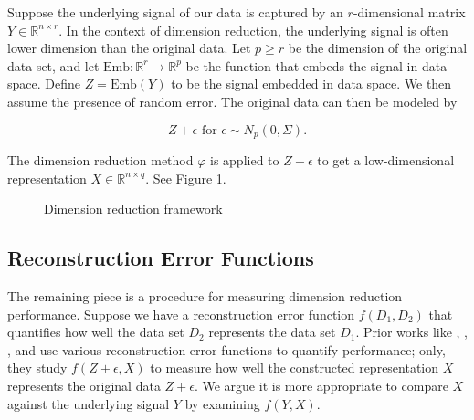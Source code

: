 \documentclass{article}
\begin{document}
Suppose the underlying signal of our data is captured by an $r$-dimensional matrix $Y \in \mathbb{R}^{n \times r}$. In the context of dimension reduction, the underlying signal is often lower dimension than the original data. Let $p \geq r$ be the dimension of the original data set, and let $\textrm{Emb}:\mathbb{R}^r \to \mathbb{R}^p$ be the function that embeds the signal in data space. Define $Z = \textrm{Emb}(Y)$ to be the signal embedded in data space. We then assume the presence of random error. The original data can then be modeled by \begin{linenomath}$$Z + \epsilon \textrm{ for } \epsilon \sim N_p(0, \Sigma).$$\end{linenomath} The dimension reduction method $\varphi$ is applied to $Z + \epsilon$ to get a low-dimensional representation $X \in \mathbb{R}^{n \times q}$. See Figure 1.

\renewcommand{\thefigure}{1}
\begin{figure}[H]
\centering
{}
\caption{Dimension reduction framework}
\end{figure}

\subsection{Reconstruction Error Functions}
The remaining piece is a procedure for measuring dimension reduction performance. Suppose we have a reconstruction error function $f(D_1, D_2)$ that quantifies how well the data set $D_2$ represents the data set $D_1$. Prior works like \cite{large DR unreliable}, \cite{quantitative survey}, \cite{evaluation of DR transcriptomics}, and \cite{t-SNE cell} use various reconstruction error functions to quantify performance; only, they study $f(Z + \epsilon, X)$ to measure how well the constructed representation $X$ represents the original data $Z + \epsilon$. We argue it is more appropriate to compare $X$ against the underlying signal $Y$ by examining $f(Y, X)$.
\end{document}
